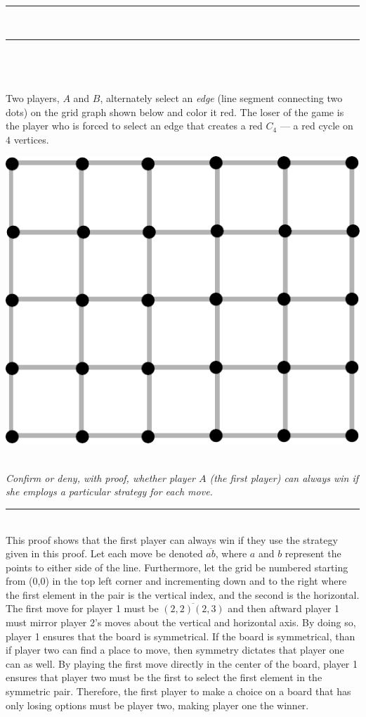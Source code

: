 \documentclass{article}
\newcommand{\problemsep}{\leavevmode\\[0.05in] \rule[\baselineskip/4]{\textwidth}{1pt} \\[0.005in] \rule[\baselineskip]{\textwidth}{1pt}\vspace{-\baselineskip/2}\leavevmode\\[0.05in]}
\newcommand{\statementsep}{\leavevmode\\[0.005in] \rule[\baselineskip/4]{\textwidth}{0.4pt}\leavevmode\\[0.005in]}
\begin{document}
\problemsep
{} \\
\\
\noindent Two players, $A$ and $B$, alternately select an \emph{edge} (line segment
connecting two dots) on the grid graph shown
below and color it red.
The loser of the game is the player who is forced to select an edge that creates
a red $C_4$ --- a red cycle on $4$ vertices.\\
\begin{center}
\includegraphics[scale=0.5]{Figures/Saturator_Grid}
\end{center}
\\
\noindent \emph{Confirm or deny, with proof, whether player $A$ (the first player) 
can always win if she employs a particular strategy for each move.}
\statementsep
This proof shows that the first player can always win if they use the strategy given in this proof. Let each move be denoted $\overline{ab}$, where $a$ and $b$ represent the points to either side of the line. Furthermore, let the grid be numbered starting from (0,0) in the top left corner and incrementing down and to the right where the first element in the pair is the vertical index, and the second is the horizontal. The first move for player 1 must be $\overline{(2,2)(2,3)}$ and then aftward player 1 must mirror player 2's moves about the vertical and horizontal axis. By doing so, player 1 ensures that the board is symmetrical.  If the board is symmetrical, than if player two can find a place to move, then symmetry dictates that player one can as well. By playing the first move directly in the center of the board, player 1 ensures that player two must be the first to select the first element in the symmetric pair. Therefore, the first player to make a choice on a board that has only losing options must be player two, making player one the winner.
\end{document}
